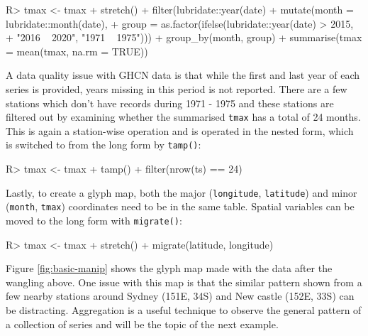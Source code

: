 \documentclass[
]{jss}
\begin{document}
\begin{CodeChunk}
\begin{CodeInput}
R> tmax <- tmax %
+   stretch() %
+   filter(lubridate::year(date) %
+   mutate(month = lubridate::month(date), 
+          group = as.factor(ifelse(lubridate::year(date) > 2015, 
+                                   "2016 ~ 2020", "1971 ~ 1975"))) %
+   group_by(month, group) %
+   summarise(tmax = mean(tmax, na.rm = TRUE))
\end{CodeInput}
\end{CodeChunk}

A data quality issue with GHCN data is that while the first and last
year of each series is provided, years missing in this period is not
reported. There are a few stations which don't have records during 1971
- 1975 and these stations are filtered out by examining whether the
summarised \texttt{tmax} has a total of 24 months. This is again a
station-wise operation and is operated in the nested form, which is
switched to from the long form by \texttt{tamp()}:

\begin{CodeChunk}
\begin{CodeInput}
R> tmax <- tmax %
+   tamp() %
+   filter(nrow(ts) == 24) 
\end{CodeInput}
\end{CodeChunk}

Lastly, to create a glyph map, both the major (\texttt{longitude},
\texttt{latitude}) and minor (\texttt{month}, \texttt{tmax}) coordinates
need to be in the same table. Spatial variables can be moved to the long
form with \texttt{migrate()}:

\begin{CodeChunk}
\begin{CodeInput}
R> tmax <- tmax %
+   stretch() %
+   migrate(latitude, longitude)
\end{CodeInput}
\end{CodeChunk}

Figure \ref{fig:basic-manip} shows the glyph map made with the data
after the wangling above. One issue with this map is that the similar
pattern shown from a few nearby stations around Sydney (151E, 34S) and
New castle (152E, 33S) can be distracting. Aggregation is a useful
technique to observe the general pattern of a collection of series and
will be the topic of the next example.
\end{document}
